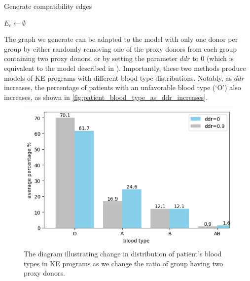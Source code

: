 \begin{algorithm}
    \caption{Generate compatibility edges}
    \label{alg:generate_compatibility_edges}


    $E_c \gets \emptyset$\;

\end{algorithm}

The graph we generate can be adapted to the model with only one donor per group by either randomly removing one of the proxy donors from each group containing two proxy donors, or by setting the parameter $ddr$ to $0$ (which is equivalent to the model described in \cite{toulis2011random}). Importantly, these two methods produce models of KE programs with different blood type distributions. Notably, as $ddr$ increases, the percentage of patients with an unfavorable blood type (‘O’) also increases, as shown in \autoref{fig:patient_blood_type_as_ddr_increases}.

\begin{figure}[H]
    \centering
    \includegraphics[width=1.\linewidth]{data/patient_blood_type_as_ddr_increases.png}
    \caption[Distribution of patient's blood types as double donor ratio changes]{The diagram illustrating change in distribution of patient's blood types in KE programs as we change the ratio of group having two proxy donors.}
    \label{fig:patient_blood_type_as_ddr_increases}
\end{figure}


